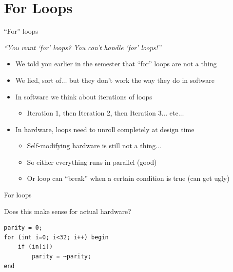 \documentclass[table,dvipsnames]{beamer}
\begin{document}
 \section{For Loops}
 \begin{frame}[fragile]{``For'' loops}
	\begin{block}{\textit{``You want `for' loops? You can't handle `for' loops!''}}
		\begin{itemize}
			\item We told you earlier in the semester that ``for'' loops are not a thing
			\item We lied, sort of... but they don't work the way they do in software
			\item In software we think about iterations of loops
			\begin{itemize} 
				\item Iteration 1, then Iteration 2, then Iteration 3... etc...
			\end{itemize}
			\item In hardware, loops need to unroll completely at design time
			\begin{itemize}
				\item Self-modifying hardware is still not a thing...
				\item So either everything runs in parallel (good)
				\item Or loop can ``break'' when a certain condition is true (can get ugly)
			\end{itemize}
		\end{itemize}
	\end{block}
\end{frame}
 
 
 
     \begin{frame}[fragile]{For loops}
	\begin{block}{Does this make sense for actual hardware?}
		\begin{itemize}
			 \begin{verbatim}
parity = 0;
for (int i=0; i<32; i++) begin
 	if (in[i])
		parity = ~parity;
end			
\end{verbatim}
			
		\end{itemize}
	\end{block}
\end{frame}
\end{document}
